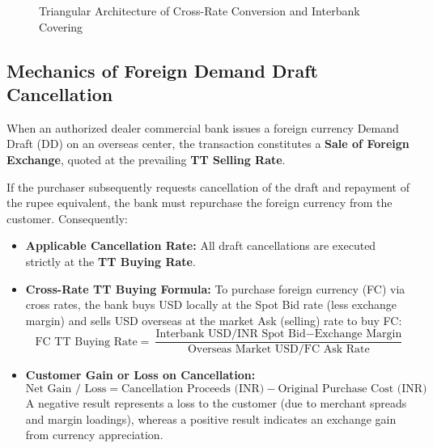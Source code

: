 \begin{figure}[htbp]
{%
    }
    \caption{Triangular Architecture of Cross-Rate Conversion and Interbank Covering}
    \label{fig:cross_rate_architecture}
\end{figure}

\subsection{Mechanics of Foreign Demand Draft Cancellation}
When an authorized dealer commercial bank issues a foreign currency Demand Draft (DD) on an overseas center, the transaction constitutes a \textbf{Sale of Foreign Exchange}, quoted at the prevailing \textbf{TT Selling Rate}.

If the purchaser subsequently requests cancellation of the draft and repayment of the rupee equivalent, the bank must repurchase the foreign currency from the customer. Consequently:
\begin{itemize}[leftmargin=*]
    \item \textbf{Applicable Cancellation Rate:} All draft cancellations are executed strictly at the \textbf{TT Buying Rate}.
    \item \textbf{Cross-Rate TT Buying Formula:}
    To purchase foreign currency (FC) via cross rates, the bank buys USD locally at the Spot Bid rate (less exchange margin) and sells USD overseas at the market Ask (selling) rate to buy FC:
    \begin{equation}
        \text{FC TT Buying Rate} = \frac{\text{Interbank USD/INR Spot Bid} - \text{Exchange Margin}}{\text{Overseas Market USD/FC Ask Rate}}
    \end{equation}
    \item \textbf{Customer Gain or Loss on Cancellation:}
    \begin{equation}
        \text{Net Gain / Loss} = \text{Cancellation Proceeds (INR)} - \text{Original Purchase Cost (INR)}
    \end{equation}
    A negative result represents a loss to the customer (due to merchant spreads and margin loadings), whereas a positive result indicates an exchange gain from currency appreciation.
\end{itemize}

